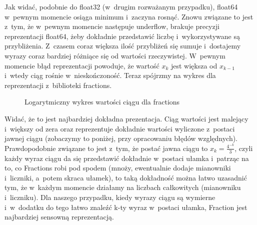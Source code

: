 Jak widać, podobnie do float32 (w~drugim rozważanym przypadku), float64 w~pewnym momencie osiąga minimum i~zaczyna rosnąć. Znowu związane to jest z~tym, że w~pewnym momencie 
następuje underflow, brakuje precyzji reprezentacji float64, żeby dokładnie przedstawić liczbę i~wykorzystywane są przybliżenia. Z~czasem coraz większa ilość przybliżeń się sumuje i~dostajemy wyrazy coraz bardziej różniące się od 
wartości rzeczywistej. W~pewnym momencie błąd reprezentacji powoduje, że wartość $x_k$ jest większa od $x_{k-1}$ i~wtedy ciąg rośnie w~nieskończoność.
\newline
\newline
Teraz spójrzmy na wykres dla reprezentacji z~biblioteki fractions.
\begin{figure}[ht!]
	\caption{Logarytmiczny wykres wartości ciągu dla fractions}
	\label{zad2:graph5}
\end{figure}

Widać, że to jest najbardziej dokładna prezentacja. Ciąg wartości jest malejący i~większy od zera oraz reprezentuje dokładnie wartości wyliczone z~postaci jawnej ciągu (zobaczymy to poniżej, przy opracowaniu błędów względnych). Prawdopodobnie związane to jest z~tym, że postać jawna ciągu to 
$x_k = \frac{4^{-k}}{3}$, czyli każdy wyraz ciągu da się przedstawić dokładnie w~postaci ułamka i~patrząc na to, co Fractions robi pod spodem (mnoży, ewentualnie dodaje mianowniki i~liczniki, a~potem skraca ułamek), to taką dokładność można łatwo uzasadnić tym, że w~każdym momencie działamy na liczbach całkowitych (mianowniku i~liczniku). Dla naszego przypadku, kiedy wyrazy ciągu są wymierne i~w~dodatku do tego łatwo znaleźć k-ty wyraz w~postaci ułamka, Fraction jest najbardziej sensowną reprezentacją.

